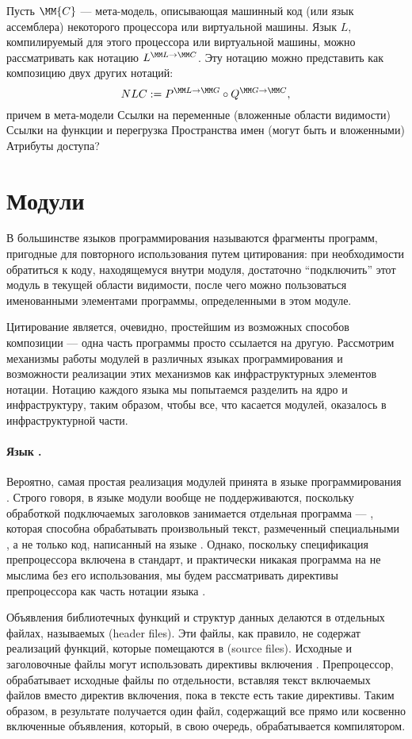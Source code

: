 {Пусть $\MM{C}$ --- мета-модель, описывающая машинный код (или язык ассемблера) некоторого процессора или виртуальной машины. Язык $L$, компилируемый для этого процессора или виртуальной машины, можно рассматривать как нотацию $\N{L}{C}$. Эту нотацию можно представить как композицию двух других нотаций: 
$$N{L}{C} := \Comp{\Not{P}{L}{G}}{\Not{Q}{G}{C}},$$
причем в мета-модели 
Ссылки на переменные (вложенные области видимости)
Ссылки на функции и перегрузка
Пространства имен (могут быть и вложенными)
Атрибуты доступа?

\section{Модули}

В большинстве языков программирования  называются фрагменты программ, пригодные для повторного использования путем цитирования: при необходимости обратиться к коду, находящемуся внутри модуля, достаточно ``подключить'' этот модуль в текущей области видимости, после чего можно пользоваться именованными элементами программы, определенными в этом модуле. \cite{???}

Цитирование является, очевидно, простейшим из возможных способов композиции --- одна часть программы просто ссылается на другую. Рассмотрим механизмы работы модулей в различных языках программирования и возможности реализации этих механизмов как инфраструктурных элементов нотации. Нотацию каждого языка мы попытаемся разделить на ядро и инфраструктуру, таким образом, чтобы все, что касается модулей, оказалось в инфраструктурной части.

\paragraph*{Язык . } Вероятно, самая простая реализация модулей принята в языке программирования  \cite{???}. Строго говоря, в языке  модули вообще не поддерживаются, поскольку обработкой подключаемых заголовков занимается отдельная программа ---  \cite{???}, которая способна обрабатывать произвольный текст, размеченный специальными , а не только код, написанный на языке . 
Однако, поскольку спецификация препроцессора включена в стандарт, и практически никакая программа на  не мыслима без его использования, мы будем рассматривать директивы препроцессора как часть нотации языка .

Объявления библиотечных функций и структур данных делаются в отдельных файлах, называемых  (header files). Эти файлы, как правило, не содержат реализаций функций, которые помещаются в  (source files). Исходные и заголовочные файлы могут использовать директивы включения . Препроцессор, обрабатывает исходные файлы по отдельности, вставляя текст включаемых файлов вместо директив включения, пока в тексте есть такие директивы. Таким образом, в результате получается один файл, содержащий все прямо или косвенно включенные объявления, который, в свою очередь, обрабатывается компилятором.

}

